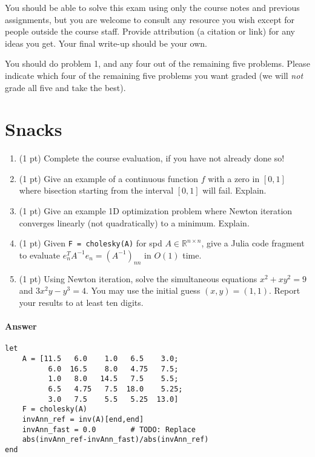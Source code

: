 \documentclass[12pt, leqno]{article} %
\providecommand{\tightlist}{%
  \setlength{\itemsep}{0pt}\setlength{\parskip}{0pt}}
\begin{document}

You should be able to solve this exam using only the course notes and
previous assignments, but you are welcome to consult any resource you
wish except for people outside the course staff. Provide attribution (a
citation or link) for any ideas you get. Your final write-up should be
your own.

You should do problem 1, and any four out of the remaining five
problems. Please indicate which four of the remaining five problems you
want graded (we will \emph{not} grade all five and take the best).

\section{Snacks}

\begin{enumerate}
\def\labelenumi{\arabic{enumi}.}
\tightlist
\item
  (1 pt) Complete the course evaluation, if you have not already done
  so!
\item
  (1 pt) Give an example of a continuous function \(f\) with a zero in
  \([0,1]\) where bisection starting from the interval \([0,1]\) will
  fail. Explain.
\item
  (1 pt) Give an example 1D optimization problem where Newton iteration
  converges linearly (not quadratically) to a minimum. Explain.
\item
  (1 pt) Given \texttt{F\ =\ cholesky(A)} for spd
  \(A \in \mathbb{R}^{n \times n}\), give a Julia code fragment to
  evaluate \(e_n^T A^{-1} e_n = (A^{-1})_{nn}\) in \(O(1)\) time.
\item
  (1 pt) Using Newton iteration, solve the simultaneous equations
  \(x^2 + xy^2 = 9\) and \(3x^2 y - y^3 = 4\). You may use the initial
  guess \((x,y) = (1,1)\). Report your results to at least ten digits.
\end{enumerate}

\paragraph{Answer}

\begin{verbatim}
let
    A = [11.5   6.0    1.0   6.5    3.0;
          6.0  16.5    8.0   4.75   7.5;
          1.0   8.0   14.5   7.5    5.5;
          6.5   4.75   7.5  18.0    5.25;
          3.0   7.5    5.5   5.25  13.0]
    F = cholesky(A)
    invAnn_ref = inv(A)[end,end]
    invAnn_fast = 0.0        # TODO: Replace
    abs(invAnn_ref-invAnn_fast)/abs(invAnn_ref)
end
\end{verbatim}
\end{document}
